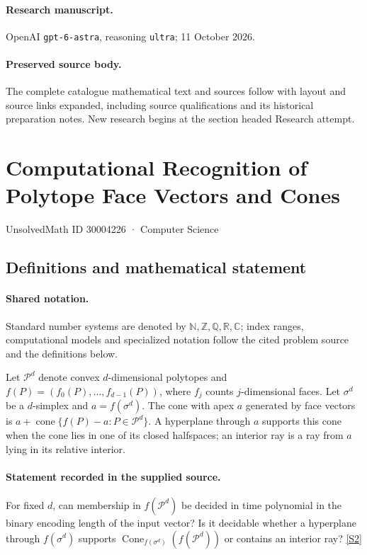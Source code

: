 \documentclass[11pt]{article}
\begin{document}
\paragraph{Research manuscript.} OpenAI \texttt{gpt-6-astra}, reasoning \texttt{ultra}; 11 October 2026.
\paragraph{Preserved source body.} The complete catalogue mathematical text and sources follow with layout and source links expanded, including source qualifications and its historical preparation notes. New research begins at the section headed Research attempt.

\section{Computational Recognition of Polytope Face Vectors and Cones}\label{30004226}
{\small UnsolvedMath ID 30004226 · Computer Science}
\subsection{Definitions and mathematical statement}

\paragraph{Shared notation.}Standard number systems are denoted by $\mathbb N,\mathbb Z,\mathbb Q,\mathbb R,\mathbb C$; index ranges, computational models and specialized notation follow the cited problem source and the definitions below.


Let $\mathcal P^d$ denote convex $d$-dimensional polytopes and $f(P)=(f_0(P),\ldots,f_{d-1}(P))$, where $f_j$ counts $j$-dimensional faces. Let $\sigma^d$ be a $d$-simplex and $a=f(\sigma^d)$. The cone with apex $a$ generated by face vectors is $a+\operatorname{cone}\{f(P)-a:P\in\mathcal P^d\}$. A hyperplane through $a$ supports this cone when the cone lies in one of its closed halfspaces; an interior ray is a ray from $a$ lying in its relative interior.
\paragraph{Statement recorded in the supplied source.}
For fixed $d$, can membership in $f(\mathcal P^d)$ be decided in time polynomial in the binary encoding length of the input vector? Is it decidable whether a hyperplane through $f(\sigma^d)$ supports $\operatorname{Cone}_{f(\sigma^d)}(f(\mathcal P^d))$ or contains an interior ray? \href{https://doi.org/10.4171/owr/2019/39}{[S2]}
\end{document}
